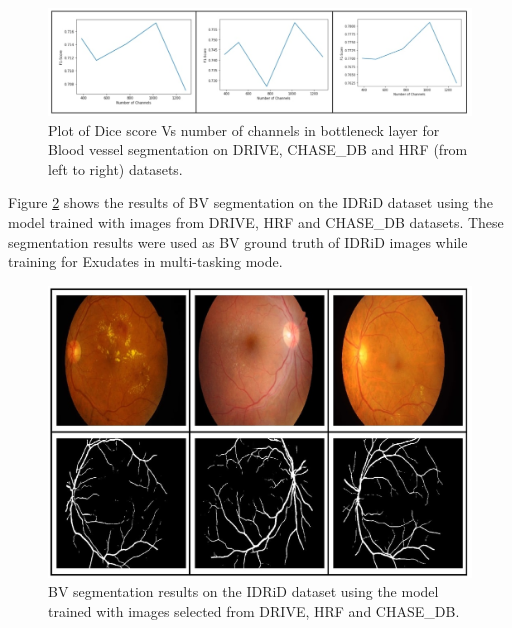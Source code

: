 \documentclass[utf8]{FrontiersinHarvard} %
\begin{document}
\begin{figure}[h!]
\begin{center}
\includegraphics[width=15cm]{images/channel_vs_dice.jpg}%
\end{center}
\caption{Plot of Dice score Vs number of channels in bottleneck layer for Blood vessel segmentation on DRIVE, CHASE\_DB and HRF (from left to right) datasets.}
\label{fig:channel_vs_dice}
\end{figure}


Figure \ref{fig:bv_results_idrid} shows the results of BV segmentation on the IDRiD dataset using the model trained with images from  DRIVE, HRF and CHASE\_DB datasets. These segmentation results were used as BV ground truth of IDRiD images while training  for Exudates in multi-tasking mode.

\begin{figure}[ht!]
\begin{center}
\includegraphics[width=15cm]{images/bv_results_idrid.jpg} %
\end{center}
\caption{BV segmentation results on the IDRiD dataset using the model trained with images selected from DRIVE, HRF and CHASE\_DB.}
\label{fig:bv_results_idrid}
\end{figure}
\end{document}
